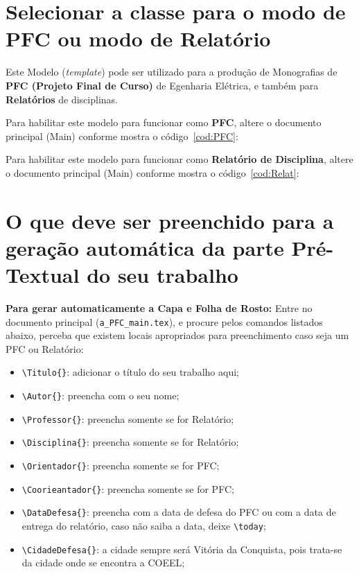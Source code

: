 
\section{Selecionar a classe para o modo de PFC ou modo de Relatório}

Este Modelo ({\it template}) pode ser utilizado para a produção de Monografias de {\bf PFC (Projeto Final de Curso)} de Egenharia Elétrica, e também para {\bf Relatórios} de disciplinas.

Para habilitar este modelo para funcionar como {\bf PFC}, altere o documento principal (Main) conforme mostra o código~\ref{cod:PFC}: 


Para habilitar este modelo para funcionar como {\bf Relatório de Disciplina}, altere o documento principal (Main) conforme mostra o código~\ref{cod:Relat}: 


\pagebreak\clearpage\newpage

\section{O que deve ser preenchido para a geração automática da parte Pré-Textual do seu trabalho}

{\bf Para gerar automaticamente a Capa e Folha de Rosto:} Entre no documento principal (\verb|a_PFC_main.tex|), e procure pelos comandos listados abaixo, perceba que existem locais apropriados para preenchimento caso seja um PFC ou Relatório:

\begin{itemize}
    \item {\Large \verb|\Titulo{}|:} adicionar o título do seu trabalho aqui;
    \item {\Large \verb|\Autor{}|:} preencha com o seu nome;
    \item {\Large \verb|\Professor{}|:} preencha somente se for Relatório;
    \item {\Large \verb|\Disciplina{}|:} preencha somente se for Relatório;
    \item {\Large \verb|\Orientador{}|:} preencha somente se for PFC;
    \item {\Large \verb|\Coorieantador{}|:} preencha somente se for PFC;
    \item {\Large \verb|\DataDefesa{}|:} preencha com a data de defesa do PFC ou com a data de entrega do relatório, caso não saiba a data, deixe \verb|\today|;
    \item {\Large \verb|\CidadeDefesa{}|:} a cidade sempre será Vitória da Conquista, pois trata-se da cidade onde se encontra a COEEL;
\end{itemize}

